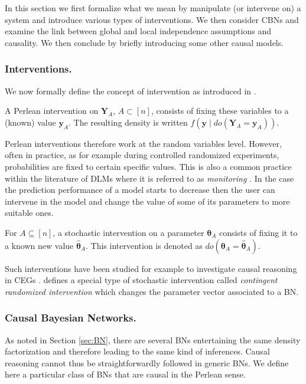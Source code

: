 In this section we first formalize what we mean by manipulate (or intervene on) a system and introduce various types of interventions. We then consider \glspl{CBN} and examine the link between global and local independence assumptions and causality. We then conclude by briefly introducing some other causal models. 

\subsubsection{Interventions.}
We now formally define the concept of intervention as introduced in \citet{Pearl2000}.

 \begin{definition}
 A Perlean intervention on $\bm{Y}_A$, $A\subset[n]$, consists of fixing these variables to a (known) value $\bm{y}_A$. The resulting density is written $f\left(\bm{y}\;|\;do(\bm{Y}_A=\bm{y}_A)\right)$.
 \end{definition} 

Perlean interventions therefore work at the random variables level. However, often in practice, as for example during controlled randomized experiments, probabilities are fixed to certain specific values. This is also a common practice within the literature of \glspl{DLM} where it is referred to as \textit{monitoring} \citep{Harrison1997,West1986,West1989}. In the case the prediction performance of a model starts to decrease then the user can intervene in the model and change the value of some of its parameters to more suitable ones.  

\begin{definition}
For $A\subseteq[n]$, a stochastic intervention on a parameter $\bm{\theta}_A$ consists of fixing it to a known new value $\hat{\bm{\theta}}_A$. This intervention is denoted as $do(\bm{\theta}_A=\hat{\bm{\theta}}_A)$.
\end{definition}
 
Such interventions have been studied for example to investigate causal reasoning in \glspl{CEG} \citet{Thwaites2010}. \citet{Daneshkhah2004} defines a special type of stochastic intervention called \textit{contingent randomized intervention} which changes the parameter vector associated to a \gls{BN}. 
 
\subsubsection{Causal Bayesian Networks.}
As noted in Section \ref{sec:BN}, there are several \glspl{BN} entertaining the same density factorization and therefore leading to the same kind of inferences. Causal reasoning cannot thus be straightforwardly followed in generic \glspl{BN}. We define here a particular class of \glspl{BN} that are causal in the Perlean sense.

